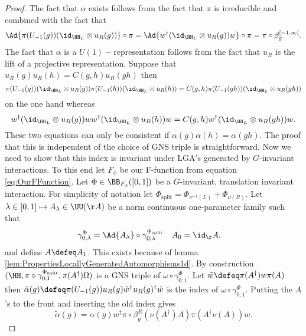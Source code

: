\begin{proof}
	The fact that $\alpha$ exists follows from the fact that $\pi$ is irreducible and combined with the fact that
	\begin{equation}
		\Ad{\pi(U_{-1}(g)) (\id_{\HH_L}\otimes u_R(g))}\circ\pi=\Ad{w^\dagger(\id_{\HH_L}\otimes u_R(g)) w}\circ\pi=\pi\circ\beta_g^{[-1,\infty[}.
	\end{equation}
	The fact that $\alpha$ is a $U(1)-$representation follows from the fact that $u_R$ is the lift of a projective representation. Suppose that $u_R(g)u_R(h)=C(g,h)u_R(gh)$ then
	\begin{equation}
		\pi(U_{-1}(g)) (\id_{\HH_L}\otimes u_R(g))\pi(U_{-1}(h)) (\id_{\HH_L}\otimes u_R(h))=C(g,h)\pi(U_{-1}(gh)) (\id_{\HH_L}\otimes u_R(gh))
	\end{equation}
	on the one hand whereas
	\begin{equation}
		w^\dagger(\id_{\HH_L}\otimes u_R(g)) ww^\dagger(\id_{\HH_L}\otimes u_R(h)) w=C(g,h)w^\dagger(\id_{\HH_L}\otimes u_R(gh)) w.
	\end{equation}
	These two equations can only be consistent if $\alpha(g)\alpha(h)=\alpha(gh)$. The proof that this is independent of the choice of GNS triple is straightforward. Now we need to show that this index is invariant under LGA's generated by $G$-invariant interactions. To this end let $F_\phi$ be our F-function from equation \eqref{eq:OurFFunction}. Let $\Phi\in\BB_{F_\phi}([0,1])$ be a $G$-invariant, translation invariant interaction. For simplicity of notation let $\Phi_{\text{split}}=\Phi_{\nu^{-1}(L)}+\Phi_{\nu(R)}$. Let $\lambda\in[0,1]\mapsto A_\lambda\in\UU(\AA)$ be a norm continuous one-parameter family such that
	\begin{align}\label{eq:DefinitionSplitting1DAppendix}
		\gamma^\Phi_{0;\lambda}&=\Ad{A_\lambda}\circ\gamma^{\Phi_{\text{split}}}_{0;\lambda}&A_0&=\id_\AA.
	\end{align}
	and define $A\defeq A_1$. This exists because of lemma \ref{lem:PropertiesLocallyGeneratedAutomorphisms1d}. By construction $(\HH,\pi\circ\gamma^{\Phi_{\text{split}}}_{0;1},\pi(A^\dagger)\Omega)$ is a GNS triple of $\omega\circ\gamma^\Phi_{0;1}$. Let $\tilde{w}\defeq \pi(A^\dagger)w\pi(A)$ then $\tilde{\alpha}(g)\defeq \pi(U_{-1}(g))u_R(g)\tilde{w}^\dagger u_R(g)^\dagger \tilde{w}$ is the index of $\omega\circ\gamma^\Phi_{0;1}$. Putting the $A$'s to the front and inserting the old index gives
	\begin{equation}
		\tilde{\alpha}(g)=\alpha(g)w^\dagger \pi\circ\beta_g^R(\nu(A^\dagger)A)\pi(A^\dagger\nu(A))w.

\end{equation}
\end{proof}
